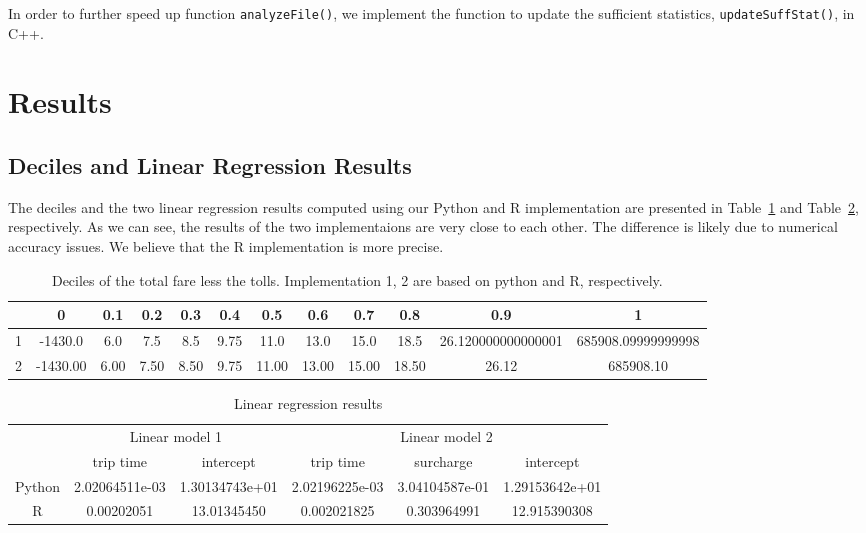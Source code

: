 \documentclass{article}
\begin{document}
In order to further speed up function \texttt{analyzeFile()}, we implement the
function to update the sufficient statistics, \texttt{updateSuffStat()}, in C++.

\section{Results}

\subsection{Deciles and Linear Regression Results}
The deciles and the two linear regression results computed using our Python and
R implementation are presented in Table~\ref{tab:decile} and Table~\ref{tab:lm},
respectively. As we can see, the results of the two implementaions are very
close to each other. The difference is likely due to numerical accuracy issues.
We believe that the R implementation is more precise.

\begin{table}[!t]
    \renewcommand{\arraystretch}{1.3}
    \caption{Deciles of the total fare less the tolls. Implementation 1, 2 are
    based on python and R, respectively.}
    \label{tab:decile}
    \centering
    \begin{tabular}{c|ccccccccccc}
        \hline
         & 0 & 0.1 & 0.2 & 0.3 & 0.4 & 0.5 & 0.6 & 0.7 & 0.8 & 0.9 & 1 \\
         \hline
        1 & -1430.0 & 6.0 & 7.5 & 8.5 & 9.75 & 11.0 & 13.0 & 15.0 & 18.5 &
        26.120000000000001 & 685908.09999999998 \\
        2 & -1430.00 & 6.00 & 7.50 & 8.50 & 9.75 & 11.00 & 13.00 & 15.00 & 18.50
        & 26.12 & 685908.10 \\
        \hline
    \end{tabular}
\end{table}

\begin{table}[!t]
    \renewcommand{\arraystretch}{1.3}
    \caption{Linear regression results}
    \label{tab:lm}
    \centering
    \begin{tabular}{c|cc|ccc}
        \hline
        \multirow{2}{*}{} & \multicolumn{2}{c|}{Linear model 1} &
        \multicolumn{3}{c}{Linear model 2} \\
        \hhline{~-----} & trip time & intercept & trip time & surcharge &
        intercept \\
        \hline
        Python & 2.02064511e-03   & 1.30134743e+01 &  2.02196225e-03 &
        3.04104587e-01 & 1.29153642e+01 \\
        R & 0.00202051 & 13.01345450 & 0.002021825 & 0.303964991 & 12.915390308
        \\
        \hline
    \end{tabular}
\end{table}
\end{document}
